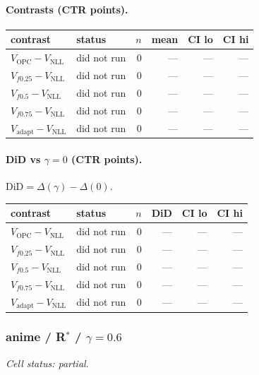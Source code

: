 \documentclass[10pt,a4paper]{article}
\begin{document}
\paragraph{Contrasts (CTR points).}
{\centering\small\begin{tabular}{llrrrr}
\toprule contrast & status & $n$ & mean & CI lo & CI hi \\
\midrule
$V_{\mathrm{OPC}}-V_{\mathrm{NLL}}$ & did not run & 0 & --- & --- & --- \\
$V_{f0.25}-V_{\mathrm{NLL}}$ & did not run & 0 & --- & --- & --- \\
$V_{f0.5}-V_{\mathrm{NLL}}$ & did not run & 0 & --- & --- & --- \\
$V_{f0.75}-V_{\mathrm{NLL}}$ & did not run & 0 & --- & --- & --- \\
$V_{\mathrm{adapt}}-V_{\mathrm{NLL}}$ & did not run & 0 & --- & --- & --- \\
\bottomrule\end{tabular}\par}
\paragraph{DiD vs $\gamma=0$ (CTR points).} $\mathrm{DiD}=\Delta(\gamma)-\Delta(0)$.
{\centering\small\begin{tabular}{llrrrr}
\toprule contrast & status & $n$ & DiD & CI lo & CI hi \\
\midrule
$V_{\mathrm{OPC}}-V_{\mathrm{NLL}}$ & did not run & 0 & --- & --- & --- \\
$V_{f0.25}-V_{\mathrm{NLL}}$ & did not run & 0 & --- & --- & --- \\
$V_{f0.5}-V_{\mathrm{NLL}}$ & did not run & 0 & --- & --- & --- \\
$V_{f0.75}-V_{\mathrm{NLL}}$ & did not run & 0 & --- & --- & --- \\
$V_{\mathrm{adapt}}-V_{\mathrm{NLL}}$ & did not run & 0 & --- & --- & --- \\
\bottomrule\end{tabular}\par}
\bigskip
\subsubsection{anime / R$^*$ / $\gamma=0.6$}
\emph{Cell status: partial}.
\end{document}
